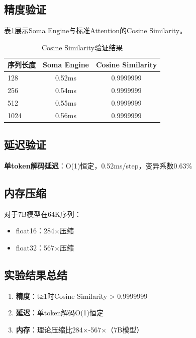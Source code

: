 \documentclass[12pt, a4paper]{article}
\begin{document}
\subsection{精度验证}

表\ref{tab:cosine}展示Soma Engine与标准Attention的Cosine Similarity。

\begin{table}[H]
\centering
\caption{Cosine Similarity验证结果}
\label{tab:cosine}
\begin{tabular}{@{}lcc@{}}
\toprule
\textbf{序列长度} & \textbf{Soma Engine} & \textbf{Cosine Similarity} \\
\midrule
128 & 0.52ms & 0.9999999 \\
256 & 0.54ms & 0.9999999 \\
512 & 0.55ms & 0.9999999 \\
1024 & 0.56ms & 0.9999999 \\
\bottomrule
\end{tabular}
\end{table}

\subsection{延迟验证}

\textbf{单token解码延迟}：O(1)恒定，0.52ms/step，变异系数0.63\%

\subsection{内存压缩}

对于7B模型在64K序列：

\begin{itemize}
    \item float16：284×压缩
    \item float32：567×压缩
\end{itemize}

\subsection{实验结果总结}

\begin{enumerate}
    \item \textbf{精度}：t≥1时Cosine Similarity > 0.9999999
    \item \textbf{延迟}：单token解码O(1)恒定
    \item \textbf{内存}：理论压缩比284×-567×（7B模型）
\end{enumerate}
\end{document}
